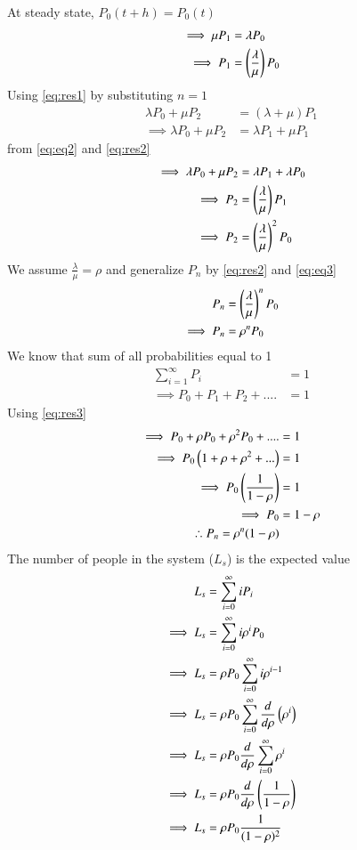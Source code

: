 \documentclass[journal,12pt,twocolumn]{IEEEtran}
\begin{document}
At steady state, $P_0(t+h)=P_0(t)$
\begin{align}
    \implies \mu P_1&=\lambda P_0\label{eq:eq2}\\
    \implies P_1&=\left(\frac{\lambda}{\mu}\right)P_0\label{eq:res2}
\end{align}
Using \eqref{eq:res1} by substituting $n=1$
\begin{align}
    \lambda P_0+\mu P_2&=(\lambda+\mu)P_1\\
    \implies \lambda P_0+\mu P_2&=\lambda P_1+\mu P_1
\end{align}
from \eqref{eq:eq2} and \eqref{eq:res2}
\begin{align}
    \implies\lambda P_0+\mu P_2&=\lambda P_1+\lambda P_0\\
    \implies P_2&=\left(\frac{\lambda}{\mu}\right)P_1\\
    \implies P_2&=\left(\frac{\lambda}{\mu}\right)^2P_0\label{eq:eq3}
\end{align}
We assume $\frac{\lambda}{\mu}=\rho$ and generalize $P_n$ by \eqref{eq:res2} and \eqref{eq:eq3}
\begin{align}
  P_n&=\left(\frac{\lambda}{\mu}\right)^nP_0\\
  \implies P_n&=\rho^nP_0\label{eq:res3}
\end{align}
We know that sum of all probabilities equal to 1
\begin{align}
    \sum_{i=1}^{\infty}P_i&=1\\
    \implies P_0+P_1+P_2+....&=1
\end{align}
Using \eqref{eq:res3}
\begin{align}
    \implies P_0+\rho P_0+\rho^2P_0+....&=1\\
    \implies P_0\left(1+\rho+\rho^2+...\right)&=1\\
    \implies P_0\left(\frac{1}{1-\rho}\right)&=1\\
    \implies P_0&=1-\rho\label{eq:res4}\\
    \therefore P_n=\rho^n(1-\rho)
\end{align}
The number of people in the system ($L_s$) is the expected value
\begin{align}
    L_s&=\sum_{i=0}^{\infty}iP_i\\
    \implies L_s&=\sum_{i=0}^{\infty}i\rho^iP_0\\
    \implies L_s&=\rho P_0\sum_{i=0}^{\infty}i\rho^{i-1}\\
    \implies L_s&=\rho P_0\sum_{i=0}^{\infty}\frac{d}{d\rho}\left(\rho^i\right)\\
    \implies L_s&=\rho P_0\frac{d}{d\rho}\sum_{i=0}^{\infty}\rho^i\\
    \implies L_s&=\rho P_0\frac{d}{d\rho}\left(\frac{1}{1-\rho}\right)\\
    \implies L_s&=\rho P_0\frac{1}{(1-\rho)^2}
\end{align}
\end{document}

